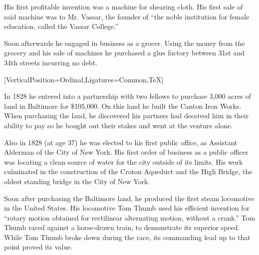 \documentclass{article}
\begin{document}
\begin{minipage}[t]{0.45\linewidth}
\begin{enumList}
\item His first profitable invention was a machine for shearing cloth. His first
sale of said machine was to Mr. Vassar, the founder of ``the noble institution
for female education, called the Vassar College.''

\item Soon afterwards he engaged in business as a grocer. Using the money from
the grocery and his sale of machines he purchased a {
glue factory} between 31st
and 34th streets { incurring no debt}.
\setcounter{enumTemp}{\value{enumListi}}
\end{enumList}
\end{minipage}\hfill
\begin{minipage}[t]{0.45\linewidth}
[VerticalPosition=Ordinal,Ligatures={Common,TeX}]
\fontsize{11pt}{13pt}\selectfont
\raggedright
\upshape
\begin{enumList}
\setcounter{enumListi}{\value{enumTemp}}

\item In 1828 he entered into a partnership with two fellows to purchase 3,000
acres of land in Baltimore for \$105,000. On this land he built the
{ Canton Iron Works}. When purchasing the land, he
discovered his partners had deceived him in their ability to pay so he bought
out their stakes and went at the venture alone.

\item Also in 1828 (at age 37) he was elected to his first public office, as
{ Assistant Alderman} of the City of New York. His first
order of business as a public officer was locating a clean source of water
for the city outside of its limits. His work culminated in the construction of
the { Croton Aqueduct} and the {
High Bridge}, the oldest standing bridge in the City of New York.

\item Soon after purchasing the Baltimore land, he produced the
{ first steam
locomotive in the United States}. His locomotive Tom Thumb used his efficient
invention for ``rotary motion obtained for rectilinear alternating motion,
without a crank.'' Tom Thumb raced against a horse-drawn train,
to demonstrate its superior speed. While Tom Thumb broke down during the race,
its commanding lead up to that point proved its value.


\end{enumList}
\end{minipage}
\end{document}
